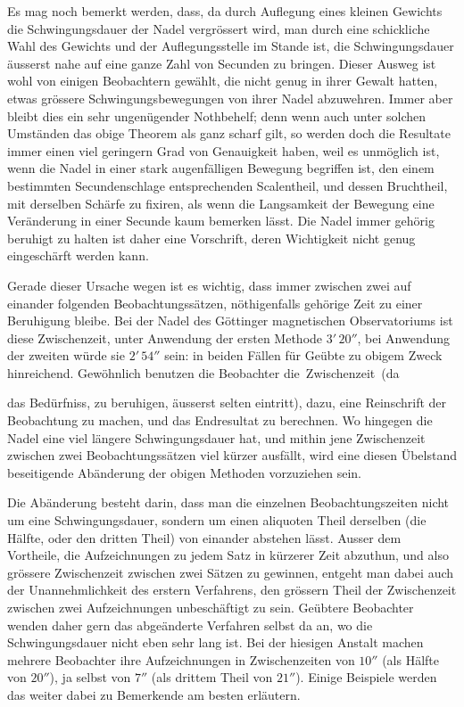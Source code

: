 Es mag noch bemerkt werden, dass, da durch Auflegung eines kleinen Gewichts die Schwingungsdauer der Nadel vergrössert wird, man durch eine schickliche Wahl des Gewichts und der Auflegungsstelle im Stande ist, die Schwingungsdauer äusserst nahe auf eine ganze Zahl von Secunden zu bringen. Dieser Ausweg ist wohl von einigen Beobachtern gewählt, die nicht genug in ihrer Gewalt hatten, etwas grössere Schwingungsbewegungen von ihrer Nadel abzuwehren. Immer aber bleibt dies ein sehr ungenügender Nothbehelf; denn wenn auch unter solchen Umständen das obige Theorem als ganz scharf gilt, so werden doch die Resultate immer einen viel geringern Grad von Genauigkeit haben, weil es unmöglich ist, wenn die Nadel in einer stark augenfälligen Bewegung begriffen ist, den einem bestimmten Secundenschlage entsprechenden Scalentheil, und dessen Bruchtheil, mit derselben Schärfe zu fixiren, als wenn die Langsamkeit der Bewegung eine Veränderung in einer Secunde kaum bemerken lässt. Die Nadel immer gehörig beruhigt zu halten ist daher eine Vorschrift, deren Wichtigkeit nicht genug eingeschärft werden kann.

Gerade dieser Ursache wegen ist es wichtig, dass immer zwischen zwei auf einander folgenden Beobachtungssätzen, nöthigenfalls gehörige Zeit zu einer Beruhigung bleibe. Bei der Nadel des Göttinger magnetischen Observatoriums ist diese Zwischenzeit, unter Anwendung der ersten Methode $3'\,20''$, bei Anwendung der zweiten würde sie $2'\,54''$ sein: in beiden Fällen für Geübte zu obigem Zweck hinreichend. Gewöhnlich benutzen die Beobachter die~Zwischenzeit~(da\par\GaussVSourceGathering{69\textsuperscript{*}}
\par\clearpage
{}
\noindent das Bedürfniss, zu beruhigen, äusserst selten eintritt), dazu, eine Reinschrift der Beobachtung zu machen, und das Endresultat zu berechnen. Wo hingegen die Nadel eine viel längere Schwingungsdauer hat, und mithin jene Zwischenzeit zwischen zwei Beobachtungssätzen viel kürzer ausfällt, wird eine diesen Übelstand beseitigende Abänderung der obigen Methoden vorzuziehen sein.

Die Abänderung besteht darin, dass man die einzelnen Beobachtungszeiten nicht um eine Schwingungsdauer, sondern um einen aliquoten Theil derselben (die Hälfte, oder den dritten Theil) von einander abstehen lässt. Ausser dem Vortheile, die Aufzeichnungen zu jedem Satz in kürzerer Zeit abzuthun, und also grössere Zwischenzeit zwischen zwei Sätzen zu gewinnen, entgeht man dabei auch der Unannehmlichkeit des erstern Verfahrens, den grössern Theil der Zwischenzeit zwischen zwei Aufzeichnungen unbeschäftigt zu sein. Geübtere Beobachter wenden daher gern das abgeänderte Verfahren selbst da an, wo die Schwingungsdauer nicht eben sehr lang ist. Bei der hiesigen Anstalt machen mehrere Beobachter ihre Aufzeichnungen in Zwischenzeiten von $10''$ (als Hälfte von $20''$), ja selbst von $7''$ (als drittem Theil von $21''$). Einige Beispiele werden das weiter dabei zu Bemerkende am besten erläutern.

